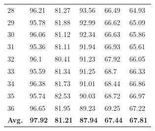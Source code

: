 \documentclass[review]{elsarticle}
\begin{document}
\begin{longtable}{C{1.5cm}|C{1.5cm}C{1.5cm}C{1.5cm}C{1.5cm}C{1.5cm}}
	28&96.21&81.27&93.56&66.49&64.93\\
	29&95.78&81.88&92.99&66.62&65.09\\
	30&96.06&81.12&92.34&66.63&65.86\\
	31&95.36&81.11&91.94&66.93&65.61\\
	32&96.1&80.41&91.23&67.92&66.05\\
	33&95.59&81.34&91.25&68.7&66.33\\
	34&96.38&81.73&91.01&68.44&66.86\\
	35&95.74&82.53&90.03&68.72&66.97\\
	36&96.65&81.95&89.23&69.25&67.22\\
	\hline
	\textbf{Avg.}&\textbf{97.92}&\textbf{81.21}&\textbf{87.94}&\textbf{67.44}&\textbf{67.81}\\
	\hline\hline	
\end{longtable}
\end{document}
